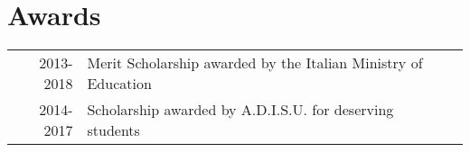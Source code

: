 \documentclass[letterpaper]{deedy-resume} %
\begin{document}
\begin{minipage}[t]{0.66\textwidth}
%
%
%
%
%
%



\section{Awards} 

\begin{tabular}{rll}
2013-2018 & Merit Scholarship awarded by the Italian Ministry of Education\\
2014-2017 & Scholarship awarded by A.D.I.S.U. for deserving students
\end{tabular}

\sectionspace %

\end{minipage} %


\newpage %
\end{document}
